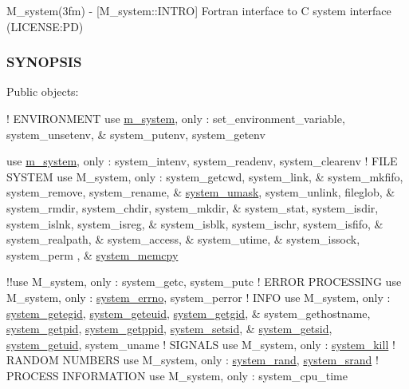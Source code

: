 M\+\_\+system(3fm) -\/ \mbox{[}M\+\_\+system\+::\+I\+N\+T\+RO\mbox{]} Fortran interface to C system interface (L\+I\+C\+E\+N\+SE\+:PD) \subsubsection*{S\+Y\+N\+O\+P\+S\+IS}

Public objects\+:

! E\+N\+V\+I\+R\+O\+N\+M\+E\+NT use \mbox{\hyperlink{namespacem__system}{m\+\_\+system}}, only \+: set\+\_\+environment\+\_\+variable, system\+\_\+unsetenv, \& system\+\_\+putenv, system\+\_\+getenv

use \mbox{\hyperlink{namespacem__system}{m\+\_\+system}}, only \+: system\+\_\+intenv, system\+\_\+readenv, system\+\_\+clearenv ! F\+I\+LE S\+Y\+S\+T\+EM use M\+\_\+system, only \+: system\+\_\+getcwd, system\+\_\+link, \& system\+\_\+mkfifo, system\+\_\+remove, system\+\_\+rename, \& \mbox{\hyperlink{interfacem__system_1_1system__umask}{system\+\_\+umask}}, system\+\_\+unlink, fileglob, \& system\+\_\+rmdir, system\+\_\+chdir, system\+\_\+mkdir, \& system\+\_\+stat, system\+\_\+isdir, system\+\_\+islnk, system\+\_\+isreg, \& system\+\_\+isblk, system\+\_\+ischr, system\+\_\+isfifo, \& system\+\_\+realpath, \& system\+\_\+access, \& system\+\_\+utime, \& system\+\_\+issock, system\+\_\+perm , \& \mbox{\hyperlink{interfacem__system_1_1system__memcpy}{system\+\_\+memcpy}}

!!use M\+\_\+system, only \+: system\+\_\+getc, system\+\_\+putc ! E\+R\+R\+OR P\+R\+O\+C\+E\+S\+S\+I\+NG use M\+\_\+system, only \+: \mbox{\hyperlink{interfacem__system_1_1system__errno}{system\+\_\+errno}}, system\+\_\+perror ! I\+N\+FO use M\+\_\+system, only \+: \mbox{\hyperlink{interfacem__system_1_1system__getegid}{system\+\_\+getegid}}, \mbox{\hyperlink{interfacem__system_1_1system__geteuid}{system\+\_\+geteuid}}, \mbox{\hyperlink{interfacem__system_1_1system__getgid}{system\+\_\+getgid}}, \& system\+\_\+gethostname, \mbox{\hyperlink{interfacem__system_1_1system__getpid}{system\+\_\+getpid}}, \mbox{\hyperlink{interfacem__system_1_1system__getppid}{system\+\_\+getppid}}, \mbox{\hyperlink{interfacem__system_1_1system__setsid}{system\+\_\+setsid}}, \& \mbox{\hyperlink{interfacem__system_1_1system__getsid}{system\+\_\+getsid}}, \mbox{\hyperlink{interfacem__system_1_1system__getuid}{system\+\_\+getuid}}, system\+\_\+uname ! S\+I\+G\+N\+A\+LS use M\+\_\+system, only \+: \mbox{\hyperlink{interfacem__system_1_1system__kill}{system\+\_\+kill}} ! R\+A\+N\+D\+OM N\+U\+M\+B\+E\+RS use M\+\_\+system, only \+: \mbox{\hyperlink{interfacem__system_1_1system__rand}{system\+\_\+rand}}, \mbox{\hyperlink{interfacem__system_1_1system__srand}{system\+\_\+srand}} ! P\+R\+O\+C\+E\+SS I\+N\+F\+O\+R\+M\+A\+T\+I\+ON use M\+\_\+system, only \+: system\+\_\+cpu\+\_\+time

